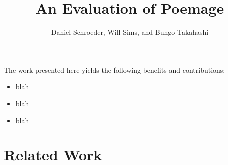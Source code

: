 \documentclass[journal]{vgtc}                %
\title{An Evaluation of Poemage}
\author{Daniel Schroeder, Will Sims, and Bungo Takahashi}
\begin{document}


\maketitle

The work presented here yields the following benefits and contributions:
\begin{itemize}
\setlength\itemsep{0em}
\item blah 
\item blah
\item blah
\end{itemize}

\section{Related Work} \label{research}
\end{document}
